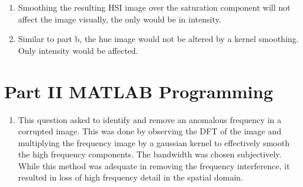 \documentclass{article}[12 pt]
\begin{document}
\begin{enumerate}
\begin{enumerate}[label=\alph*]
		\item Smoothing the resulting HSI image over the saturation component will not affect the image visually, the only would be in intensity. 

		\item Similar to part b, the hue image would not be altered by a kernel smoothing.  Only intensity would be affected.
	\end{enumerate}

\end{enumerate}

\section*{Part II MATLAB Programming}
\begin{enumerate}
\item This question asked to identify and remove an anomalous frequency in a corrupted image.  This was done by observing the DFT of the image and multiplying the frequency image by a gaussian kernel to effectively smooth the high frequency components.  The bandwidth was chosen subjectively.  While this method was adequate in removing the frequency interference, it resulted in loss of high frequency detail in the spatial domain.


\end{enumerate}
\end{document}
